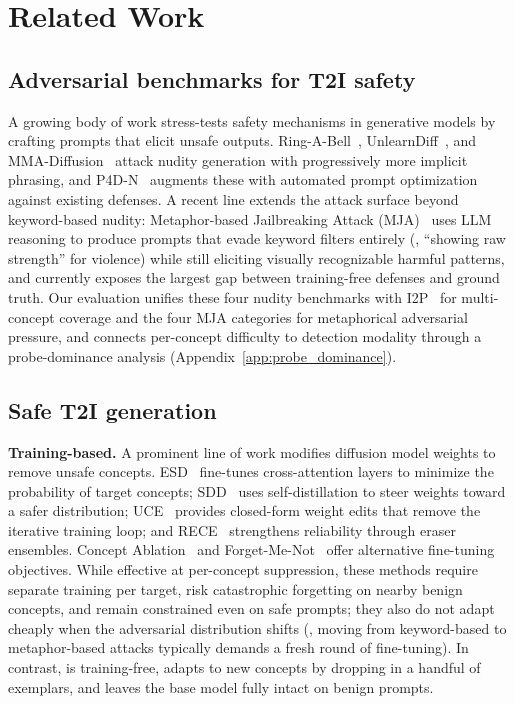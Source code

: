 \section{Related Work}

\subsection{Adversarial benchmarks for T2I safety}
A growing body of work stress-tests safety mechanisms in generative models by crafting prompts that elicit unsafe outputs. Ring-A-Bell~\citep{tsai2023ring}, UnlearnDiff~\citep{zhang2024generate}, and MMA-Diffusion~\citep{yang2024mma} attack nudity generation with progressively more implicit phrasing, and P4D-N~\citep{chin2023prompting4debugging} augments these with automated prompt optimization against existing defenses. A recent line extends the attack surface beyond keyword-based nudity: Metaphor-based Jailbreaking Attack (MJA)~\citep{zhang2026reason2attack} uses LLM reasoning to produce prompts that evade keyword filters entirely (\eg, ``showing raw strength'' for violence) while still eliciting visually recognizable harmful patterns, and currently exposes the largest gap between training-free defenses and ground truth. Our evaluation unifies these four nudity benchmarks with I2P~\citep{schramowski2023safe} for multi-concept coverage and the four MJA categories for metaphorical adversarial pressure, and connects per-concept difficulty to detection modality through a probe-dominance analysis (Appendix~\ref{app:probe_dominance}).

\subsection{Safe T2I generation}

\textbf{Training-based.} A prominent line of work modifies diffusion model weights to remove unsafe concepts. ESD~\citep{gandikota2023erasing} fine-tunes cross-attention layers to minimize the probability of target concepts; SDD~\citep{kim2023towards} uses self-distillation to steer weights toward a safer distribution; UCE~\citep{gandikota2024unified} provides closed-form weight edits that remove the iterative training loop; and RECE~\citep{gong2024reliable} strengthens reliability through eraser ensembles. Concept Ablation~\citep{kumari2023ablating} and Forget-Me-Not~\citep{zhang2024forget} offer alternative fine-tuning objectives. While effective at per-concept suppression, these methods require separate training per target, risk catastrophic forgetting on nearby benign concepts, and remain constrained even on safe prompts; they also do not adapt cheaply when the adversarial distribution shifts (\eg, moving from keyword-based to metaphor-based attacks typically demands a fresh round of fine-tuning). In contrast, \ours{} is training-free, adapts to new concepts by dropping in a handful of exemplars, and leaves the base model fully intact on benign prompts.

